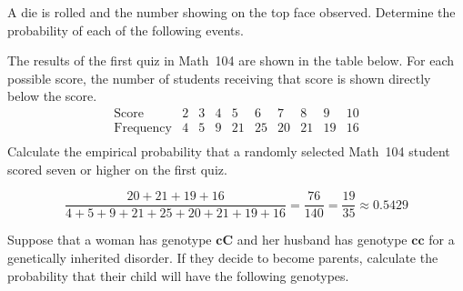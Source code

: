 \documentclass[addpoints,12pt]{exam}
\begin{document}
\begin{questions}

\question[15] A die is rolled and the number
showing on the top face observed. Determine the probability
of each of the following events.
\ifprintanswers\else\newpage\fi

\question[10] The results of the first quiz in Math~104 are
shown in the table below. For each possible score, the number
of students receiving that score is shown directly below
the score.
\[\begin{array}{c|cccccccccc}
\text{Score}&2&3&4&5&6&7&8&9&10\\\hline
\text{Frequency}&4&5&9&21&25&20&21&19&16\\
\end{array}\]
Calculate the empirical probability that a randomly
selected Math~104 student scored seven or higher
on the first quiz.
\begin{solution}[2in]
\[\frac{20+21+19+16}{4+5+9+21+25+20+21+19+16}
=\frac{76}{140}=\frac{19}{35}\approx 0.5429\]
\end{solution}

\question[15] Suppose that a woman has genotype $\mathbold{cC}$
and her husband has genotype $\mathbold{cc}$ for a
genetically inherited disorder.
If they decide to become parents, calculate the
probability that their child will
have the following genotypes.
\end{questions}
\end{document}
